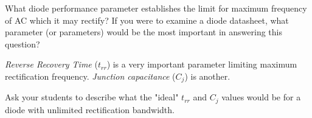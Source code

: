 

What diode performance parameter establishes the limit for maximum frequency of AC which it may rectify?  If you were to examine a diode datasheet, what parameter (or parameters) would be the most important in answering this question?







{\it Reverse Recovery Time} ($t_{rr}$) is a very important parameter limiting maximum rectification frequency.  {\it Junction capacitance} ($C_j$) is another.







Ask your students to describe what the "ideal" $t_{rr}$ and $C_j$ values would be for a diode with unlimited rectification bandwidth.




